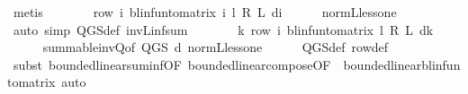 \begin{isabellebody}
\ metis\isanewline
\ \ \isamarkupfalse%
\ \isamarkupfalse%
\ {\isachardoublequoteopen}{\isasymdots}\ {\isacharequal}{\kern0pt}\ row\ i\ {\isacharparenleft}{\kern0pt}blinfun{\isacharunderscore}{\kern0pt}to{\isacharunderscore}{\kern0pt}matrix\ {\isacharparenleft}{\kern0pt}{\isasymSum}i{\isachardot}{\kern0pt}\ {\isacharparenleft}{\kern0pt}l\ {\isacharasterisk}{\kern0pt}\isactrlsub R\ {\isasymP}\isactrlsub L\ d{\isacharparenright}{\kern0pt}{\isacharcircum}{\kern0pt}{\isacharcircum}{\kern0pt}i{\isacharparenright}{\kern0pt}{\isacharparenright}{\kern0pt}{\isachardoublequoteclose}\isanewline
\ \ \ \ \isamarkupfalse%
\ norm{\isacharunderscore}{\kern0pt}{\isasymP}\isactrlsub L{\isacharunderscore}{\kern0pt}less{\isacharunderscore}{\kern0pt}one\isanewline
\ \ \ \ \isamarkupfalse%
\ {\isacharparenleft}{\kern0pt}auto\ simp{\isacharcolon}{\kern0pt}\ Q{\isacharunderscore}{\kern0pt}GS{\isacharunderscore}{\kern0pt}def\ inv\isactrlsub L{\isacharunderscore}{\kern0pt}inf{\isacharunderscore}{\kern0pt}sum{\isacharparenright}{\kern0pt}\isanewline
\ \ \isamarkupfalse%
\ \isamarkupfalse%
\ {\isachardoublequoteopen}{\isasymdots}\ {\isacharequal}{\kern0pt}\ {\isacharparenleft}{\kern0pt}{\isasymSum}k{\isachardot}{\kern0pt}\ row\ i\ {\isacharparenleft}{\kern0pt}blinfun{\isacharunderscore}{\kern0pt}to{\isacharunderscore}{\kern0pt}matrix\ {\isacharparenleft}{\kern0pt}{\isacharparenleft}{\kern0pt}l\ {\isacharasterisk}{\kern0pt}\isactrlsub R\ {\isasymP}\isactrlsub L\ d{\isacharparenright}{\kern0pt}{\isacharcircum}{\kern0pt}{\isacharcircum}{\kern0pt}k{\isacharparenright}{\kern0pt}{\isacharparenright}{\kern0pt}{\isacharparenright}{\kern0pt}{\isachardoublequoteclose}\isanewline
\ \ \ \ \isamarkupfalse%
\ summable{\isacharunderscore}{\kern0pt}inv{\isacharunderscore}{\kern0pt}Q{\isacharbrackleft}{\kern0pt}of\ {\isachardoublequoteopen}Q{\isacharunderscore}{\kern0pt}GS\ d{\isachardoublequoteclose}{\isacharbrackright}{\kern0pt}\ norm{\isacharunderscore}{\kern0pt}{\isasymP}\isactrlsub L{\isacharunderscore}{\kern0pt}less{\isacharunderscore}{\kern0pt}one\isanewline
\ \ \ \ \isamarkupfalse%
\ Q{\isacharunderscore}{\kern0pt}GS{\isacharunderscore}{\kern0pt}def\ row{\isacharunderscore}{\kern0pt}def\isanewline
\ \ \ \ \isamarkupfalse%
\ {\isacharparenleft}{\kern0pt}subst\ bounded{\isacharunderscore}{\kern0pt}linear{\isachardot}{\kern0pt}suminf{\isacharbrackleft}{\kern0pt}OF\ bounded{\isacharunderscore}{\kern0pt}linear{\isacharunderscore}{\kern0pt}compose{\isacharbrackleft}{\kern0pt}OF\ {\isacharunderscore}{\kern0pt}\ bounded{\isacharunderscore}{\kern0pt}linear{\isacharunderscore}{\kern0pt}blinfun{\isacharunderscore}{\kern0pt}to{\isacharunderscore}{\kern0pt}matrix{\isacharbrackright}{\kern0pt}{\isacharbrackright}{\kern0pt}{\isacharparenright}{\kern0pt}\ auto\isanewline

\end{isabellebody}
